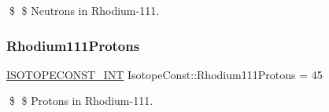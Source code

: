 \$ \$ Neutrons in Rhodium-\/111. \mbox{\label{group___isotope_const-_rhodium-_rh111_ga2b429bdf94c1a9e3481f0a965bbb4611}} 
\subsubsection{\texorpdfstring{Rhodium111\+Protons}{Rhodium111Protons}}
{\footnotesize\ttfamily \mbox{\hyperlink{group___isotope_const-_macros_ga5f18360b3e99483a35c32d789e62621c}{I\+S\+O\+T\+O\+P\+E\+C\+O\+N\+S\+T\+\_\+\+I\+NT}} Isotope\+Const\+::\+Rhodium111\+Protons = 45}

\$ \$ Protons in Rhodium-\/111. 